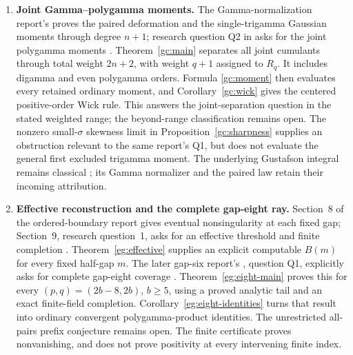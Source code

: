\begin{enumerate}
\item \textbf{Joint Gamma--polygamma moments.}
The Gamma-normalization report's
 proves the paired deformation and
the single-trigamma Gaussian moments through degree $n+1$;
research question Q2 in
 asks for the joint
polygamma moments \cite{GammaIncoming}.
Theorem~\ref{gc:main} separates all joint cumulants through total
weight $2n+2$, with weight $q+1$ assigned to $R_q$.
It includes digamma and even polygamma orders. Formula
\eqref{gc:moment} then evaluates every retained ordinary moment,
and Corollary~\ref{gc:wick} gives the centered positive-order Wick
rule. This answers the joint-separation question in the stated
weighted range; the beyond-range classification remains open.
The nonzero small-$\sigma$ skewness limit in
Proposition~\ref{gc:sharpness} supplies an obstruction relevant to
the same report's Q1, but does not evaluate the general first
excluded trigamma moment.
The underlying Gustafson integral remains classical
\cite{DerkachovManashov}; its Gamma normalizer and the paired law
retain their incoming attribution.

\item \textbf{Effective reconstruction and the complete gap-eight ray.}
Section~8 of the ordered-boundary report gives eventual
nonsingularity at each fixed gap; Section~9, research question~1,
asks for an effective threshold and finite completion
\cite{OrderedIncoming}. Theorem~\ref{eg:effective} supplies an
explicit computable $B(m)$ for every fixed half-gap $m$.
The later gap-six report's
, question Q1,
explicitly asks for complete gap-eight coverage \cite{GapSix}.
Theorem~\ref{eg:eight-main} proves this for every
$(p,q)=(2b-8,2b)$, $b\ge5$, using a proved analytic tail and an
exact finite-field completion. Corollary~\ref{eg:eight-identities}
turns that result into ordinary convergent polygamma-product
identities. The unrestricted all-pairs prefix conjecture remains
open. The finite certificate proves nonvanishing, and does not
prove positivity at every intervening finite index.


\end{enumerate}
